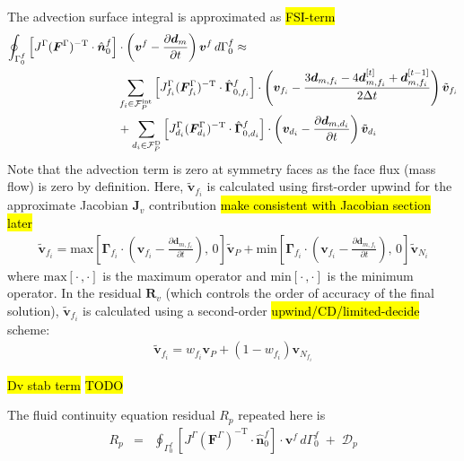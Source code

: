 \documentclass[sn-mathphys,Numbered]{sn-jnl}%
\newcommand{\bb}{\boldsymbol}
\begin{document}
The advection surface integral is approximated as \hl{FSI-term}
\begin{align}
	\oint_{\Gamma^f_0}  \left[ J^\Gamma (\bb{F}^\Gamma)^{-\text{T}} \cdot \hat{\bb{n}}_0^f \right]
		& \cdot \left(\bb{v}^f - \frac{\partial \bb{d}_m}{\partial t}\right) \bb{v}^f \, d\Gamma^f_0
		\approx \notag \\
		& \sum_{f_i \in \mathcal{F}_P^{\text{int}}}
	\left[ J^\Gamma_{f_i} (\bb{F}^\Gamma_{f_i})^{-\text{T}} \cdot \hat{\bb{\Gamma}}_{0, f_i}^f \right]
		\cdot \left( \bb{v}_{f_i} - \frac{3 \bb{d}_{m,f_i} - 4 \bb{d}_{m,f_i}^{[t]} + \bb{d}_{m,f_i}^{[t-1]}}{2\Delta t}  \right) \tilde{\bb{v}}_{f_i} \notag \\
	&+ \sum_{d_i \in \mathcal{F}_P^{\text{D}}} \left[ J^\Gamma_{d_i} (\bb{F}^\Gamma_{d_i})^{-\text{T}} \cdot \hat{\bb{\Gamma}}_{0, d_i}^f \right]
		 \cdot \left( \bb{v}_{d_i} - \frac{\partial \bb{d}_{m,d_i}}{\partial t} \right) \tilde{\bb{v}}_{d_i}
\end{align}
Note that the advection term is zero at symmetry faces as the face flux (mass flow) is zero by definition.
Here, $\tilde{\bb{v}}_{f_i}$ is calculated using first-order upwind for the approximate Jacobian $\bb{J}_v$ contribution \hl{make consistent with Jacobian section later}
\begin{eqnarray}
	\tilde{\bb{v}}_{f_i} =
		\text{max}\left[ \bb{\Gamma}_{f_i} \cdot \left( \bb{v}_{f_i} - \frac{\partial \bb{d}_{m,f_i}}{\partial t} \right), \, 0\right] \tilde{\bb{v}}_P
		+ \text{min}\left[ \bb{\Gamma}_{f_i} \cdot \left( \bb{v}_{f_i} - \frac{\partial \bb{d}_{m,f_i}}{\partial t} \right), \, 0\right] \tilde{\bb{v}}_{N_i}
\end{eqnarray}
where $\text{max}\left[\cdot \,, \cdot \right]$ is the maximum operator and $\text{min}\left[\cdot \,, \cdot \right]$ is the minimum operator.
In the residual $\bb{R}_v$ (which controls the order of accuracy of the final solution), $\tilde{\bb{v}}_{f_i}$ is calculated using a second-order \hl{upwind/CD/limited-decide} scheme:
\begin{eqnarray}
	\tilde{\bb{v}}_{f_i} =  w_{f_i} \bb{v}_P + (1 - w_{f_i}) \bb{v}_{N_{f_i}}
\end{eqnarray}

\hl{Dv stab term}
\hl{TODO}

The fluid continuity equation residual $R_p$ repeated here is
\begin{eqnarray}
    R_p
    &=&	\oint_{\Gamma^f_0}  \left[ J^\Gamma (\bb{F}^\Gamma)^{-\text{T}}  \cdot \hat{\bb{n}}_0^f \right] \cdot \bb{v}^f \, d\Gamma^f_0 \;+\; \mathcal{D}_p
\end{eqnarray}
\end{document}
